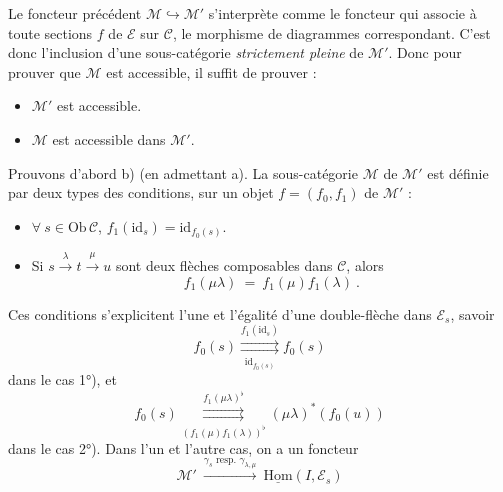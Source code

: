 \documentclass[11pt]{article}
\newcommand{\msp}[1]{\marginpar{\footnotesize [#1]}}
\newcommand{\uHom}{\underline{\mathrm{Hom}}}
\newcommand{\Ob}{\mathrm{Ob}\,}
\newcommand{\id}{\mathrm{id}}
\begin{document}
\msp{page 404}
Le foncteur précédent $\mathcal{M} \hookrightarrow \mathcal{M}'$ s’interprète comme le foncteur qui associe à toute sections $f$ de $\mathcal{E}$ sur $\mathcal{C}$, le morphisme de diagrammes correspondant. C’est donc l’inclusion d’une sous-catégorie \textit{strictement pleine} de $\mathcal{M}'$. Donc pour prouver que $\mathcal{M}$ est accessible, il suffit de prouver : %
\begin{itemize}[leftmargin=2.5em]
\item[a)] $\mathcal{M}'$ est accessible.
\item[b)] $\mathcal{M}$ est accessible dans $\mathcal{M}'$.
\end{itemize}
Prouvons d’abord b) (en admettant a). La sous-catégorie $\mathcal{M}$ de $\mathcal{M}'$ est définie par deux types des conditions, sur un objet $f = (f_0,f_1)$ de $\mathcal{M}'$ :
\begin{itemize}[leftmargin=2.5em]
\item[1°)] $\forall\ s \in \Ob\mathcal{C}$, $f_1(\id_s) = \id_{f_0(s)}$.
\item[2°)] Si $s \xrightarrow{\lambda} t \xrightarrow{\mu} u$ sont deux flèches composables dans $\mathcal{C}$, alors
\[
f_1(\mu\lambda) \ = \ f_1(\mu)f_1(\lambda) \ .
\]
\end{itemize}
Ces conditions s’explicitent l’une et l’égalité d’une double-flèche dans $\mathcal{E}_s$,
\msp{page 405}
savoir
\[
f_0(s) \overset{f_1(\id_s)}{\underset{\id_{f_0(s)}}{\rightrightarrows}} f_0(s)
\]
dans le cas 1°), et
\[
f_0(s) \overset{f_1(\mu\lambda)^\flat}{\underset{(f_1(\mu)f_1(\lambda))^\flat}{\rightrightarrows}} (\mu\lambda)^*(f_0(u))
\]
dans le cas 2°). Dans l’un et l’autre cas, on a un foncteur
\[
\mathcal{M}' \ \xrightarrow{\gamma_s \text{ resp. } \gamma_{\lambda,\mu}} \ \uHom(I,\mathcal{E}_s)
\]
\end{document}

